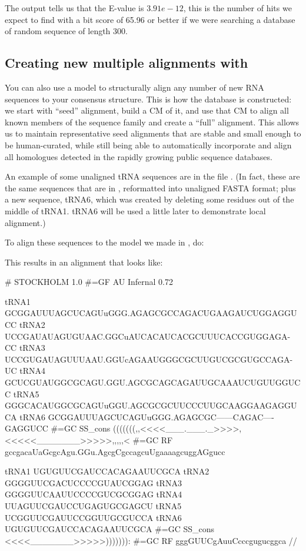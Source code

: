 The output tells us that the E-value is $3.91e-12$, this is the number
of hits we expect to find with a bit score of 65.96 or better if we
were searching a database of random sequence of length 300.

\subsection{Creating new multiple alignments with }

You can also use a model to structurally align any number of new RNA
sequences to your consensus structure. This is how the 
database is constructed: we start with ``seed'' alignment, build a CM
of it, and use that CM to align all known members of the sequence
family and create a ``full'' alignment. This allows us to maintain
representative seed alignments that are stable and small enough to be
human-curated, while still being able to automatically incorporate and
align all homologues detected in the rapidly growing public sequence
databases.

An example of some unaligned tRNA sequences are in the file
. (In fact, these are the same sequences that are in
, reformatted into unaligned FASTA format; plus a
new sequence, tRNA6, which was created by deleting some residues out
of the middle of tRNA1. tRNA6 will be used a little later to
demonstrate local alignment.)

To align these sequences to the model we made in , do:


This results in an alignment that looks like:

{\samepage
\begin{sreoutput}
# STOCKHOLM 1.0
#=GF AU    Infernal 0.72

tRNA1             GCGGAUUUAGCUCAGUuGGG.AGAGCGCCAGACUGAAGAUCUGGAGGUCC
tRNA2             UCCGAUAUAGUGUAAC.GGCuAUCACAUCACGCUUUCACCGUGGAGA-CC
tRNA3             UCCGUGAUAGUUUAAU.GGUcAGAAUGGGCGCUUGUCGCGUGCCAGA-UC
tRNA4             GCUCGUAUGGCGCAGU.GGU.AGCGCAGCAGAUUGCAAAUCUGUUGGUCC
tRNA5             GGGCACAUGGCGCAGUuGGU.AGCGCGCUUCCCUUGCAAGGAAGAGGUCA
tRNA6             GCGGAUUUAGCUCAGUuGGG.AGAGCGC------CAGAC----GAGGUCC
#=GC SS_cons      (((((((,,<<<<___.___._>>>>,<<<<<_______>>>>>,,,,,<
#=GC RF           gccgacaUaGcgcAgu.GGu.AgcgCgccagcuUgaaaagcuggAGgucc

tRNA1             UGUGUUCGAUCCACAGAAUUCGCA
tRNA2             GGGGUUCGACUCCCCGUAUCGGAG
tRNA3             GGGGUUCAAUUCCCCGUCGCGGAG
tRNA4             UUAGUUCGAUCCUGAGUGCGAGCU
tRNA5             UCGGUUCGAUUCCGGUUGCGUCCA
tRNA6             UGUGUUCGAUCCACAGAAUUCGCA
#=GC SS_cons      <<<<_______>>>>>))))))):
#=GC RF           gggGUUCgAuuCcccgugucggca
//
\end{sreoutput}
}

